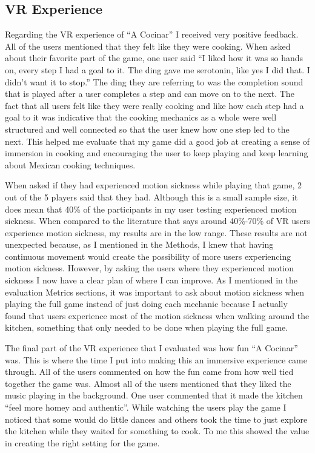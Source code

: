 \documentclass[10pt,twocolumn]{article}
\begin{document}
\subsection{VR Experience}
Regarding the VR experience of “A Cocinar” I received very positive feedback. All of the users mentioned that they felt like they were cooking. When asked about their favorite part of the game, one user said “I liked how it was so hands on, every step I had a goal to it. The ding gave me serotonin, like yes I did that. I didn’t want it to stop.” The ding they are referring to was the completion sound that is played after a user completes a step and can move on to the next. The fact that all users felt like they were really cooking and like how each step had a goal to it was indicative that the cooking mechanics as a whole were well structured and well connected so that the user knew how one step led to the next. This helped me evaluate that my game did a good job at creating a sense of immersion in cooking and encouraging the user to keep playing and keep learning about Mexican cooking techniques. \par
When asked if they had experienced motion sickness while playing that game, 2 out of the 5 players said that they had. Although this is a small sample size, it does mean that 40\% of the participants in my user testing experienced motion sickness. When compared to the literature that says around 40\%-70\% of VR users experience motion sickness, my results are in the low range\cite{motionsicknessvr2019}. These results are not unexpected because, as I mentioned in the Methods, I knew that having continuous movement would create the possibility of more users experiencing motion sickness. However, by asking the users where they experienced motion sickness I now have a clear plan of where I can improve. As I mentioned in the evaluation Metrics sections, it was important to ask about motion sickness when playing the full game instead of just doing each mechanic because I actually found that users experience most of the motion sickness when walking around the kitchen, something that only needed to be done when playing the full game. \par
The final part of the VR experience that I evaluated was how fun “A Cocinar” was. This is where the time I put into making this an immersive experience came through. All of the users commented on how the fun came from how well tied together the game was. Almost all of the users mentioned that they liked the music playing in the background. One user commented that it made the kitchen “feel more homey and authentic”. While watching the users play the game I noticed that some would do little dances and others took the time to just explore the kitchen while they waited for something to cook. To me this showed the value in creating the right setting for the game.
\end{document}
